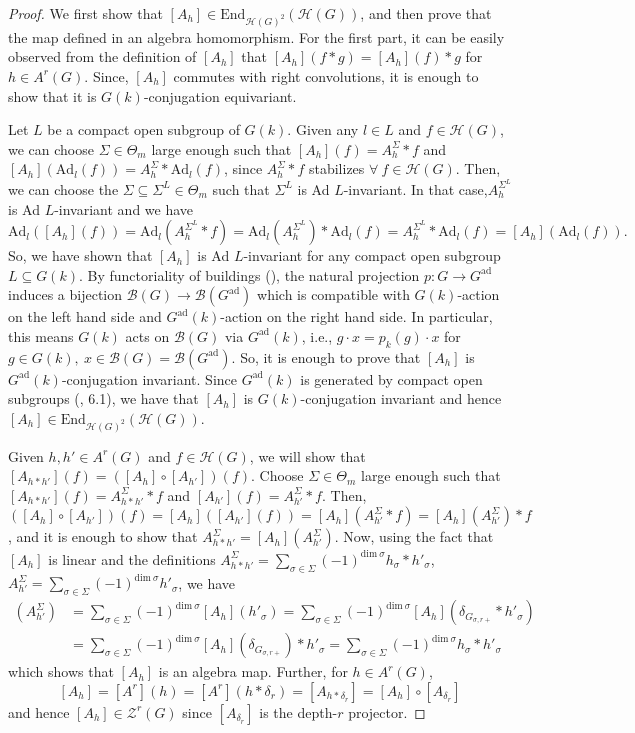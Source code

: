 \documentclass[11 pt]{article}
\numberwithin{equation}{subsection}
\theoremstyle{definition}
\theoremstyle{remark}
\theoremstyle{conjecture}
\newcommand{\Ad}{\mathrm{Ad}}
\newcommand{\HH}{\mathcal H}
\newcommand{\B}{\mathcal{B}}
\newcommand{\mc}{\mathcal}
\begin{document}
\begin{proof}
    We first show that $[A_h]\in \text{End}_{\HH(G)^{2}}(\HH(G))$, and then prove that the map defined in an algebra homomorphism. For the first part,  it can be easily observed from the definition of $[A_h]$ that $[A_h](f*g)=[A_h](f)*g$ for $h\in A^r(G)$. Since, $[A_h]$ commutes with right convolutions, it is enough to show that it is $G(k)$-conjugation equivariant.\par
    Let $L$ be a compact open subgroup of $ G(k)$. Given any $ l \in L$ and $f \in \HH(G)$, we can choose $\Sigma \in \Theta_m$ large enough such that $[A_h](f) = A^\Sigma_h*f$ and $[A_h](\Ad_l(f)) = A^\Sigma_h*\Ad_l(f)$, since $A^\Sigma_h*f$ stabilizes $\forall \: f \in \HH(G)$.  Then, we can choose the $\Sigma \subseteq \Sigma^L \in \Theta_m$ such that $\Sigma^L$ is Ad $L$-invariant. In that case,$A^{\Sigma^L}_h$ is Ad $L$-invariant and we have 
    \[
    \Ad_l([A_h](f))=\Ad_l(A^{\Sigma^L}_h*f)=\Ad_l(A^{\Sigma^L}_h)*\Ad_l(f)=A^{\Sigma^L}_h*\Ad_l(f)=[A_h](\Ad_l(f)).
    \]
    So, we have shown that $[A_h]$ is Ad $L$-invariant for any compact open subgroup $L \subseteq G(k)$.
    By functoriality of buildings (\cite[Theorem 2.1.8]{Landvogt}), the natural projection $p:G \rightarrow G^{\text{ad}}$ induces a bijection $\B(G)\rightarrow\B(G^{\text{ad}})$ which is compatible with $G(k)$-action on the left hand side and $G^{\text{ad}}(k)$-action on the right hand side.  In particular, this means $G(k)$ acts on $\B(G)$ via $G^{\text{ad}}(k)$, i.e., $g\cdot x = p_k(g)\cdot x$ for $g\in G(k),\: x \in \B(G)=\B(G^{\text{ad}})$. So, it is enough to prove that $[A_h]$ is $G^{\text{ad}}(k)$-conjugation invariant. Since $G^{\text{ad}}(k)$ is generated by compact open subgroups (\cite{BKV2}, 6.1), we have that $[A_h]$ is $G(k)$-conjugation invariant and hence $[A_h]\in \text{End}_{\HH(G)^{2}}(\HH(G))$.\par
    Given $h,h' \in A^r(G)$ and $f \in \HH(G)$, we will show that $[A_{h*h'}](f)=([A_h]\circ [A_{h'}])(f)$.  Choose $\Sigma \in \Theta_m$ large enough such that $[A_{h*h'}](f)=A^\Sigma_{h*h'}*f$ and $[A_{h'}](f)=A^\Sigma_{h'}*f$. Then, $([A_h]\circ [A_{h'}])(f)=[A_h]([A_{h'}](f))=[A_h](A^\Sigma_{h'}*f)=[A_h](A^\Sigma_{h'})*f$, and it is enough to show that $A^\Sigma_{h*h'}=[A_h](A^\Sigma_{h'})$. Now, using the fact that $[A_h]$ is linear and the definitions $A^\Sigma_{h*h'}=\sum_{\sigma \in \Sigma }(-1)^{\text{dim} \: \sigma} h_\sigma *{h'}_\sigma$, $A^\Sigma_{h'}= \sum_{\sigma \in \Sigma }(-1)^{\text{dim} \: \sigma}{h'}_\sigma$, we have 
\begin{align*}
    [A_h](A^\Sigma_{h'})&=\sum_{\sigma \in \Sigma}(-1)^{\text{dim} \: \sigma}[A_h]({h'}_\sigma)=\sum_{\sigma \in \Sigma}(-1)^{\text{dim} \: \sigma}[A_h](\delta_{G_{\sigma, r+}}*{h'}_\sigma)\\
    &=\sum_{\sigma \in \Sigma}(-1)^{\text{dim} \: \sigma}[A_h](\delta_{G_{\sigma, r+}})*{h'}_\sigma=\sum_{\sigma \in \Sigma}(-1)^{\text{dim} \: \sigma}h_\sigma*{h'}_\sigma
\end{align*}
    which shows that $[A_h]$ is an algebra map. Further, for $h\in A^r(G)$, $$[A_h]=[A^r](h)= [A^r](h*\delta_r)= [A_{h*\delta_r}]= [A_h]\circ [A_{\delta_r}]$$
    and hence $[A_h]\in \mc Z^r(G)$ since $[A_{\delta_r}]$ is the depth-$r$ projector.
    

\end{proof}
\end{document}
